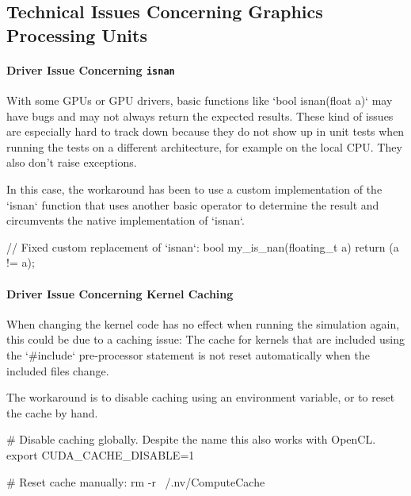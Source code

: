 
\subsection{Technical Issues Concerning Graphics Processing Units}
\label{sec:gpu_technical_issues}

\paragraph{Driver Issue Concerning \texttt{isnan}}
With some GPUs or GPU drivers, basic functions like `bool isnan(float a)` may have bugs and may not always return the expected results. These kind of issues are especially hard to track down because they do not show up in unit tests when running the tests on a different architecture, for example on the local CPU. They also don't raise exceptions.

In this case, the workaround has been to use a custom implementation of the `isnan` function that uses another basic operator to determine the result and circumvents the native implementation of `isnan`.

\begin{ccode}
// Fixed custom replacement of `isnan`:
bool my_is_nan(floating_t a) { return (a != a); }
\end{ccode}



\paragraph{Driver Issue Concerning Kernel Caching}
When changing the kernel code has no effect when running the simulation again, this could be due to a caching issue: The cache for kernels that are included using the `#include` pre-processor statement is not reset automatically when the included files change.

The workaround is to disable caching using an environment variable, or to reset the cache by hand.

\begin{bash}
# Disable caching globally. Despite the name this also works with OpenCL.
export CUDA_CACHE_DISABLE=1

# Reset cache manually:
rm -r ~/.nv/ComputeCache
\end{bash}



